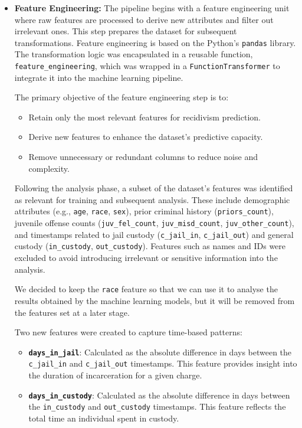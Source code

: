 \begin{itemize}
	\item \textbf{Feature Engineering:}
	The pipeline begins with a feature engineering unit where raw features are processed to derive new attributes and filter out irrelevant ones. This step prepares the dataset for subsequent transformations. Feature engineering is based on the Python’s \texttt{pandas} library. The transformation logic was encapsulated in a reusable function, \texttt{feature\_engineering}, which was wrapped in a \texttt{FunctionTransformer} to integrate it into  the machine learning pipeline. 
	
	The primary objective of the feature engineering step is to:
	\begin{itemize}
		\item Retain only the most relevant features for recidivism prediction.
		\item Derive new features to enhance the dataset’s predictive capacity.
		\item Remove unnecessary or redundant columns to reduce noise and complexity.
	\end{itemize}
	
	Following the analysis phase, a subset of the dataset's features was identified as relevant for training and subsequent analysis. These include demographic attributes (e.g., \texttt{age}, \texttt{race}, \texttt{sex}), prior criminal history (\texttt{priors\_count}), juvenile offense counts (\texttt{juv\_fel\_count}, \texttt{juv\_misd\_count}, \texttt{juv\_other\_count}), and timestamps related to jail custody (\texttt{c\_jail\_in}, \texttt{c\_jail\_out}) and general custody (\texttt{in\_custody}, \texttt{out\_custody}). Features such as names and IDs were excluded to avoid introducing irrelevant or sensitive information into the analysis.
	
	We decided to keep the \texttt{race} feature so that we can use it to analyse the results obtained by the machine learning models, but it will be removed from the features set at a later stage.
	
	Two new features were created to capture time-based patterns:
	\begin{itemize}
		\item \textbf{\texttt{days\_in\_jail}}: Calculated as the absolute difference in days between the \texttt{c\_jail\_in} and \texttt{c\_jail\_out} timestamps. This feature provides insight into the duration of incarceration for a given charge.
		\item \textbf{\texttt{days\_in\_custody}}: Calculated as the absolute difference in days between the \texttt{in\_custody} and \texttt{out\_custody} timestamps. This feature reflects the total time an individual spent in custody.
	\end{itemize}
	

\end{itemize}
